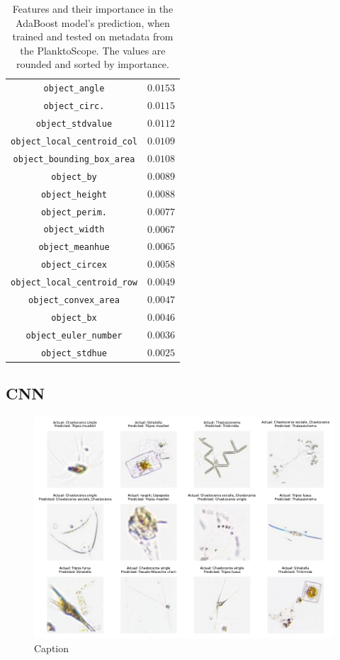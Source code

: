 \begin{table}[h!]
\begin{tabular}{cc}
        \verb|object_angle| & $0.0153$ \\
        \verb|object_circ.| & $0.0115$ \\
        \verb|object_stdvalue| & $0.0112$ \\
        \verb|object_local_centroid_col| & $0.0109$ \\
        \verb|object_bounding_box_area| & $0.0108$ \\
        \verb|object_by| & $0.0089$ \\
        \verb|object_height| & $0.0088$ \\
        \verb|object_perim.| & $0.0077$ \\
        \verb|object_width| & $0.0067$ \\
        \verb|object_meanhue| & $0.0065$ \\
        \verb|object_circex| & $0.0058$ \\
        \verb|object_local_centroid_row| & $0.0049$ \\
        \verb|object_convex_area| & $0.0047$ \\
        \verb|object_bx| & $0.0046$ \\
        \verb|object_euler_number| & $0.0036$ \\
        \verb|object_stdhue| & $0.0025$ \\
        \hline
    \end{tabular}
    \caption{Features and their importance in the AdaBoost model's prediction, when trained and tested on metadata from the PlanktoScope. The values are rounded and sorted by importance.}
    \label{tab:adaboost_ft_imp}
\end{table}


\subsection{CNN}\label{ap:cnn}


\begin{figure}
    \centering
    \includegraphics[width=0.8\linewidth]{examples/tests_even/figs/wrong-preds2-2024-12-06_1241.pdf}
    \caption{Caption}
    \label{fig:cnn-wrong-ps}
\end{figure}

